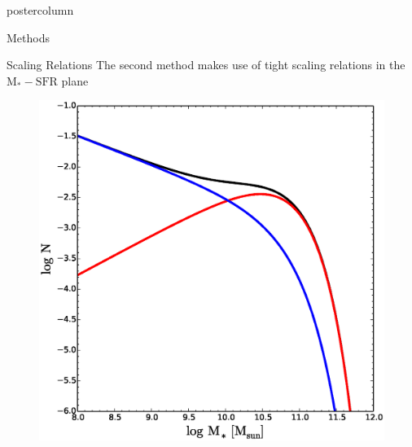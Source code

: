 \documentclass{beamer}
\begin{document}
\begin{frame}
\begin{columns}
\begin{column}{.5\textwidth}
\begin{beamercolorbox}[center,wd=\textwidth]{postercolumn}
\begin{minipage}[T]{.95\textwidth}
{\begin{myblock}{\LARGE Methods}
					\end{myblock}\vfill
					\begin{myblock}{\LARGE Scaling Relations}
						The second method makes use of tight scaling relations in the
						$\mathrm{M_{*}-SFR}$ plane
						\begin{figure}
							\begin{minipage}{0.32\textwidth}
								\centering\includegraphics[width=\textwidth]{img/Baldry.eps}
								\caption{}
							\end{minipage}
							\begin{minipage}{0.32\textwidth}

\end{minipage}
\end{figure}
\end{myblock}}
\end{minipage}
\end{beamercolorbox}
\end{column}
\end{columns}
\end{frame}
\end{document}
